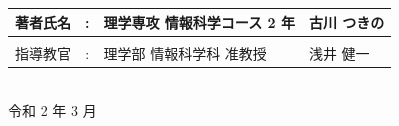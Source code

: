 \begin{titlepage}
\begin{center}
  {\LARGE
    \begin{tabular}{@{}lcl@{\quad}l}
      著者氏名 & : & 理学専攻 情報科学コース 2 年 & 古川 つきの\\[-1mm] \hline \\[-5mm]
      指導教官 & : & 理学部 情報科学科 准教授  & 浅井 健一\\[-1mm] \hline
    \end{tabular}
  }\\
  \vspace*{18mm}
  {\LARGE 令和 2 年 3 月}
\end{center}

\end{titlepage}
